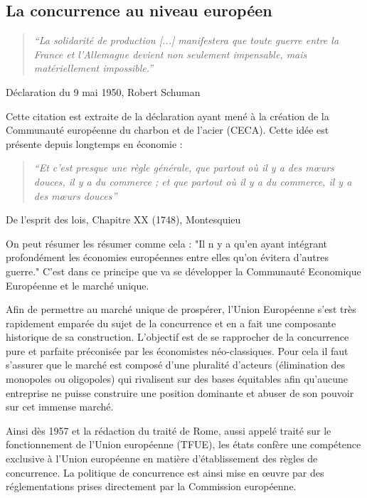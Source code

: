 \subsection{La concurrence au niveau européen}


\begin{quote}
\begin{center}
\textit{``La solidarité de production [...] manifestera que toute guerre entre la France et l'Allemagne devient non seulement impensable, mais matériellement impossible.''}
\end{center}
\end{quote} \hfill Déclaration du 9 mai 1950, Robert Schuman

Cette citation est extraite de la déclaration ayant mené à la création de la Communauté européenne du charbon et de l'acier (CECA). Cette idée est présente depuis longtemps en économie :

\begin{quote}
\begin{center}
\textit{``Et c’est presque une règle générale, que partout où il y a des mœurs douces, il y a du commerce ; et que partout où il y a du commerce, il y a des mœurs douces''}
\end{center}
\end{quote} \hfill De l’esprit des lois, Chapitre XX (1748), Montesquieu

On peut résumer les résumer comme cela : "Il n y a qu'en ayant intégrant profondément les économies européennes entre elles qu'on évitera d'autres guerre." C'est dans ce principe que va se développer la Communauté Economique Européenne et le marché unique. 

Afin de permettre au marché unique de prospérer, l'Union Européenne s'est très rapidement emparée du sujet de la concurrence et en a fait une composante historique de sa construction. L'objectif est de se rapprocher de la concurrence pure et parfaite préconisée par les économistes néo-classiques. Pour cela il faut s'assurer que le marché est composé d’une pluralité d’acteurs (élimination des monopoles ou oligopoles) qui rivalisent sur des bases équitables afin qu'aucune entreprise ne puisse construire une position dominante et abuser de son pouvoir sur cet immense marché.

Ainsi dès 1957 et la rédaction du traité de Rome, aussi appelé traité sur le fonctionnement de l'Union européenne (TFUE), les états  confère une compétence exclusive à l’Union européenne en matière d’établissement des règles de concurrence. La politique de concurrence est ainsi mise en œuvre par des réglementations prises directement par la Commission européenne.



